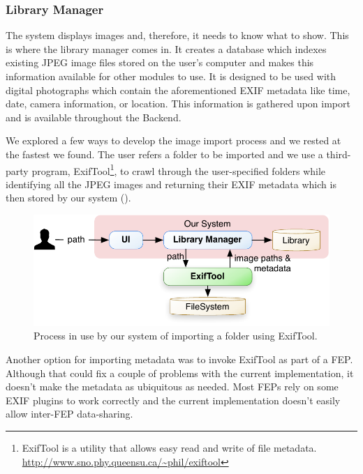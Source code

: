 \subsubsection{Library Manager} %
\label{ssub:library_manager}

The system displays images and, therefore, it needs to know what to show. This is where the library manager comes in. It creates a database which indexes existing JPEG image files stored on the user's computer and makes this information available for other modules to use. It is designed to be used with digital photographs which contain the aforementioned EXIF metadata like time, date, camera information, or location. This information is gathered upon import and is available throughout the Backend.

We explored a few ways to develop the image import process and we rested at the fastest we found. The user refers a folder to be imported and we use a third-party program, ExifTool\footnote{ExifTool is a utility that allows easy read and write of file metadata. \url{http://www.sno.phy.queensu.ca/~phil/exiftool}}, to crawl through the user-specified folders while identifying all the JPEG images and returning their \ac{EXIF} metadata which is then stored by our system ().

\begin{figure}[ht]
	\centering
		\includegraphics[scale=0.6]{Figures/import.pdf}
	\caption{Process in use by our system of importing a folder using ExifTool.}
	\label{fig:arch:import}
\end{figure}


Another option for importing metadata was to invoke ExifTool as part of a \ac{FEP}. Although that could fix a couple of problems with the current  implementation, it doesn’t make the metadata as ubiquitous as needed. Most \acp{FEP} rely on some \ac{EXIF} plugins to work correctly and the current implementation doesn’t easily allow inter-\ac{FEP} data-sharing.





